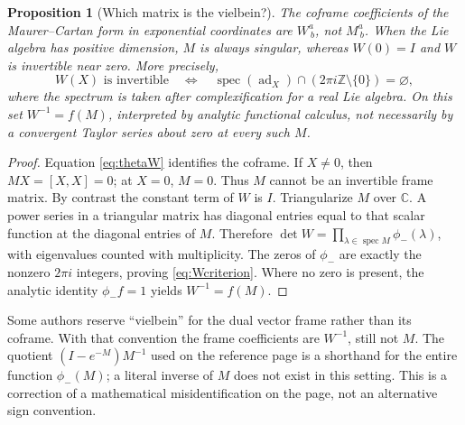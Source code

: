 \documentclass[11pt]{article}
\numberwithin{equation}{section}
\newtheorem{proposition}[proposition]{Proposition}
\theoremstyle{definition}
\theoremstyle{remark}
\DeclareMathOperator{\ad}{ad}
\DeclareMathOperator{\spec}{spec}
\newcommand{\C}{\mathbb{C}}
\newcommand{\Z}{\mathbb{Z}}
\begin{document}
\begin{proposition}[Which matrix is the vielbein?]\label{prop:vielbein}
The coframe coefficients of the Maurer--Cartan form in exponential
coordinates are $W^a_{\ b}$, not $M^a_{\ b}$. When the Lie algebra has positive dimension, $M$ is
always singular, whereas $W(0)=I$ and $W$ is invertible near zero.
More precisely,
\begin{equation}\label{eq:Wcriterion}
 W(X)\text{ is invertible}
 \quad\Longleftrightarrow\quad
 \spec(\ad_X)\cap(2\pi i\Z\setminus\{0\})=\varnothing,
\end{equation}
where the spectrum is taken after complexification for a real Lie
algebra. On this set $W^{-1}=f(M)$, interpreted by analytic
functional calculus, not necessarily by a convergent Taylor series
about zero at every such $M$.
\end{proposition}
\begin{proof}
Equation \eqref{eq:thetaW} identifies the coframe. If $X\ne0$, then
$MX=[X,X]=0$; at $X=0$, $M=0$. Thus $M$ cannot be an invertible
frame matrix. By contrast the constant term of $W$ is $I$.
Triangularize $M$ over $\C$. A power series in a triangular matrix
has diagonal entries equal to that scalar function at the diagonal
entries of $M$. Therefore
$\det W=\prod_{\lambda\in\spec M}\phi_-(\lambda)$,
with eigenvalues counted with multiplicity. The zeros of
$\phi_-$ are exactly the nonzero $2\pi i$ integers, proving
\eqref{eq:Wcriterion}. Where no zero is present, the analytic
identity $\phi_-f=1$ yields $W^{-1}=f(M)$.
\end{proof}
Some authors reserve ``vielbein'' for the dual vector frame rather
than its coframe. With that convention the frame coefficients are
$W^{-1}$, still not $M$. The quotient
$(I-e^{-M})M^{-1}$ used on the reference page is a shorthand for
the entire function $\phi_-(M)$; a literal inverse of $M$ does not
exist in this setting. This is a correction of a mathematical
misidentification on the page, not an alternative sign convention.
\end{document}
